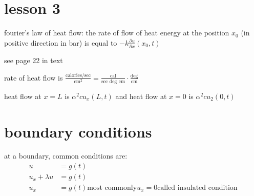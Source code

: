 \documentclass{article}
\begin{document}
\section*{lesson 3}
fourier's law of heat flow: the rate of flow of heat energy at the position $x_0$ (in positive direction in bar) is equal to $-k\frac{\partial u}{\partial x}(x_0,t)$

see page 22 in text

rate of heat flow is $\frac{\text{calories/sec}}{\text{cm}^2}=\frac{\text{cal}}{\text{sec deg cm}}\cdot\frac{\text{deg}}{\text{cm}}$

heat flow at $x=L$ is $\alpha^2 c u_x(L,t)$ and heat flow at $x=0$ is $\alpha^2 c u_2(0,t)$
\section*{boundary conditions}
at a boundary, common conditions are:
\begin{align*}
  u&=g(t)\\
  u_x+\lambda u&=g(t)\\
  u_x&=g(t) \text{most commonly} u_x=0 \text{called insulated condition}
\end{align*}
\end{document}

